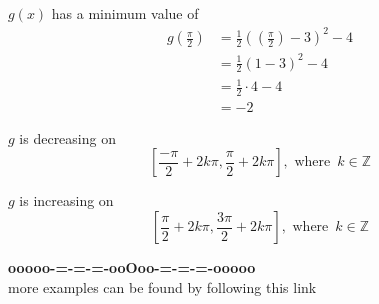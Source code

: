 \documentclass{ximera}
\begin{document}
$g(x)$ has a minimum value of
\begin{align*}
g\left( \frac{\pi}{2} \right) &= \frac{1}{2} \left(\left( \frac{\pi}{2} \right) - 3 \right)^2 - 4 \\
                               &= \frac{1}{2} (1 - 3)^2 - 4 \\
                               &= \frac{1}{2} \cdot 4 - 4 \\
                               &=  -2
\end{align*}



$g$ is decreasing on 
\[
\left[ \frac{-\pi}{2} + 2k\pi, \frac{\pi}{2} + 2k\pi \right], \text{ where } \,  k \in \mathbb{Z}
\]




$g$ is increasing on 
\[
\left[ \frac{\pi}{2} + 2k\pi, \frac{3\pi}{2} + 2k\pi \right], \text{ where } \,  k \in \mathbb{Z}
\]





\begin{onlineOnly}
\begin{center}
\textbf{\textcolor{green!50!black}{ooooo-=-=-=-ooOoo-=-=-=-ooooo}} \\

more examples can be found by following this link\\ 

\end{center}
\end{onlineOnly}
\end{document}
